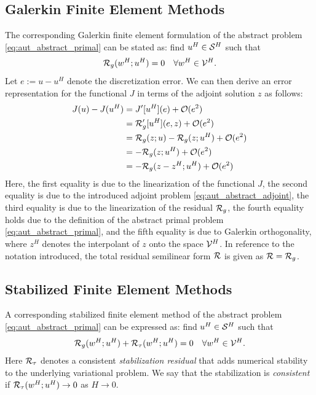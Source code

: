 \subsection{Galerkin Finite Element Methods}

The corresponding Galerkin finite element formulation of the abstract
problem \eqref{eq:aut_abstract_primal} can be stated as: find
$u^H \in \S^H$ such that
%
\begin{gather}
\R_g(w^H; u^H) = 0 \quad \forall w^H \in \V^H.
\label{eq:aut_abstract_fem}
\end{gather}
%
Let $e := u-u^H$ denote the discretization error. We can then derive an
error representation for the functional $J$ in terms of the adjoint solution
$z$ as follows:
%
\begin{gather}
\begin{aligned}
J(u) - J(u^H) &= J'[u^H](e) + \O(e^2) \\
&= \R_g'[u^H](e, z) + \O(e^2) \\
&= \R_g(z; u) - \R_g(z; u^H) + \O(e^2) \\
&= - \R_g(z; u^H) + \O(e^2) \\
&= - \R_g(z - z^H; u^H) + \O(e^2)
\end{aligned}
\label{eq:aut_abstract_galerkin_error}
\end{gather}
%
Here, the first equality is due to the linearization \cite{becker2001optimal}
of the functional $J$, the second equality is due to the introduced adjoint
problem \eqref{eq:aut_abstract_adjoint}, the third equality is due to the
linearization \cite{becker2001optimal} of the residual $\R_g$, the fourth
equality holds due to the definition of the abstract primal problem
\eqref{eq:aut_abstract_primal}, and the fifth equality is due to Galerkin
orthogonality, where $z^H$ denotes the interpolant of $z$ onto the space
$\V^H$. In reference to the notation introduced, the
total residual semilinear form $\R$ is given as $\R = \R_g$.

\subsection{Stabilized Finite Element Methods}

A corresponding stabilized finite element method of the abstract problem
\eqref{eq:aut_abstract_primal} can be expressed as: find $u^H \in \S^H$ such
that
%
\begin{gather}
\R_g(w^H; u^H) + \R_{\tau}(w^H; u^H) = 0 \quad \forall w^H \in \V^H.
\label{eq:aut_abstract_stabilized_fem}
\end{gather}
%
Here $\R_{\tau}$ denotes a consistent \emph{stabilization residual} that adds
numerical stability to the underlying variational problem. We say that the
stabilization is \emph{consistent} if $\R_{\tau}(w^H ; u^H) \to 0$ as
$H \to 0$.

